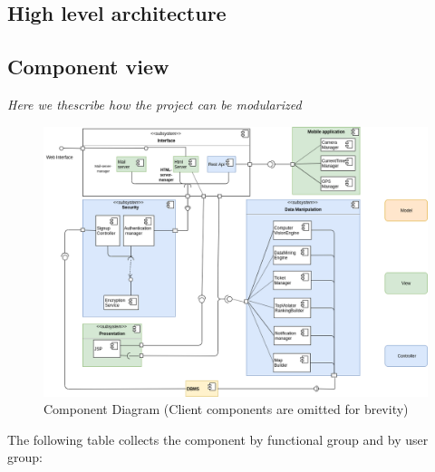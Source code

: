 \documentclass{article}
\begin{document}
	\subsection{High level architecture}
	\subsection{Component view} \label{Section:Component view} \textit{Here we thescribe how the project can be modularized}\\
	\begin{figure}
		\includegraphics[width=\linewidth]{images/Component_Diagram.png}
		\caption{Component Diagram (Client components are omitted for brevity)}
	\end{figure}
	The following table collects the component by functional group and by user group:
\end{document}
